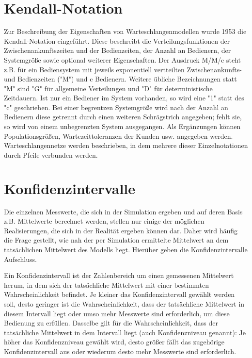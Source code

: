 \section*{Kendall-Notation}


Zur Beschreibung der Eigenschaften von Warteschlangenmodellen wurde 1953 die Kendall-Notation eingeführt.
Diese beschreibt die Verteilungsfunktionen der Zwischenankunftszeiten und der Bedienzeiten, der Anzahl an
Bedienern, der Systemgröße sowie optional weiterer Eigenschaften. Der Ausdruck M/M/c steht z.B. für ein
Bediensystem mit jeweils exponentiell vertteilten Zwischenankunfts- und Bedienzeiten ("M") und c Bedienern.
Weitere übliche Bezeichnungen statt "M" sind "G" für allgemeine Verteilungen und "D" für deterministische
Zeitdauern. Ist nur ein Bediener im System vorhanden, so wird eine "1" statt des "c" geschrieben. Bei einer
begrentzen Systemgröße wird nach der Anzahl an Bedienern diese getrennt durch einen weiteren Schrägstrich
angegeben; fehlt sie, so wird von einem unbegrenzten System ausgegangen. Als Ergänzungen können Populationsgrößen,
Wartezeittoleranzen der Kunden usw. angegeben werden. Warteschlangennetze werden beschrieben, in dem mehrere
dieser Einzelnotationen durch Pfeile verbunden werden.

\section*{Konfidenzintervalle}


Die einzelnen Messwerte, die sich in der Simulation ergeben und auf
deren Basis z.B. Mittelwerte
berechnet werden, stellen nur einige der möglichen Realisierungen,
die sich in der Realität ergeben können dar. Daher wird häufig die
Frage gestellt, wie nah der per Simulation ermittelte Mittelwert
an dem tatsächlichen Mittelwert des Modells liegt. Hierüber geben
die Konfidenzintervalle Aufschluss.


Ein Konfidenzintervall ist der Zahlenbereich um einen gemessenen Mittelwert
herum, in dem sich der tatsächliche Mittelwert mit einer bestimmten
Wahrscheinlichkeit befindet. Je kleiner das Konfidenzintervall gewählt
werden soll, desto geringer ist die Wahrscheinlichkeit, dass der tatsächliche
Mittelwert in diesem Intervall liegt oder umso mehr Messwerte sind erforderlich,
um diese Bedienung zu erfüllen. Dasselbe gilt für die Wahrscheinlichkeit,
dass der tatsächliche Mittelwert in dem Intervall liegt (auch Konfidenzniveau genannt):
Je höher das Konfidenzniveau gewählt wird, desto größer fällt das zugehörige
Konfidenzintervall aus oder wiederum desto mehr Messwerte sind erforderlich.

